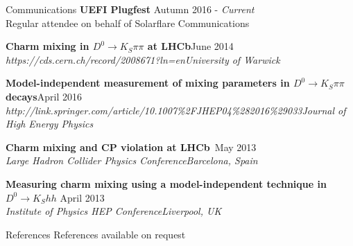 \documentclass{format/resume} %
\begin{document}

\begin{rSection}{Communications}
  {\bf UEFI Plugfest} \hfill {Autumn 2016 - \it Current} \\
  { Regular attendee on behalf of Solarflare Communications }

  {\bf Charm mixing in $D^{0}\rightarrow K_{S}\pi\pi$ at LHCb}\hfill{June 2014}\\
  {\it https://cds.cern.ch/record/2008671?ln=en}\hfill{\it University of Warwick}

  {\bf Model-independent measurement of mixing parameters in $D^{0}\rightarrow K_{S}\pi\pi$ decays}\hfill{April 2016}\\
  {\it http://link.springer.com/article/10.1007\%2FJHEP04\%282016\%29033}\hfill{\it Journal of High Energy Physics}


  {\bf Charm mixing and CP violation at LHCb}\hfill{\ May 2013}\\
  {\it Large Hadron Collider Physics Conference}\hfill{\it Barcelona, Spain}

  {\bf Measuring charm mixing using a model-independent technique in $D^{0} \rightarrow K_{S}hh$}\hfill{ April 2013}\\
  {\it Institute of Physics HEP Conference}\hfill{\it Liverpool, UK}
\end{rSection}


\begin{rSection}{References}
  References available on request
\end{rSection}

\end{document}
